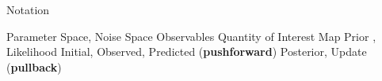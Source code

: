 \begin{block}{Notation}
\centering
\large
    \begin{itemize}
        \itembox{$\lambda\in\pspace,\; \noise\in\nspace$} Parameter Space, Noise Space
        \itembox{$\data\in \dspace$} Observables
         Quantity of Interest Map
        \itembox{$  \prior ,\; \likelihood  $} Prior , Likelihood
        \itembox{$  \initial ,\; \observed ,\; \predicted $} Initial, Observed, Predicted (\textbf{pushforward})
        \itembox{$   \posterior,\; \updated  $} Posterior, Update (\textbf{pullback})
        
    \end{itemize}

\end{block}